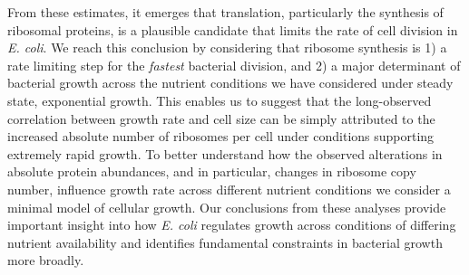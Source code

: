 From these estimates, it emerges that translation, particularly the synthesis
of ribosomal proteins, is a plausible candidate that limits the rate of cell
division in \textit{E. coli}. We reach this conclusion by considering that
ribosome synthesis is 1) a rate limiting step for the \textit{fastest}
bacterial division, and 2) a major determinant of bacterial growth across the
nutrient conditions we have considered under steady state, exponential
growth. This enables us to suggest that the long-observed correlation between
growth rate and cell size \citep{schaechter1958, si2017} can be simply
attributed to the increased absolute number of ribosomes per cell under
conditions supporting extremely rapid growth. To better understand how the
observed alterations in absolute protein abundances, and in particular,
changes in ribosome copy number, influence growth rate across different
nutrient conditions we consider a minimal model of cellular growth. Our
conclusions from these analyses provide important insight into how \textit{E.
coli} regulates growth across conditions of differing nutrient availability
and identifies fundamental constraints in bacterial growth more broadly.

\begin{figure}
\end{figure}
